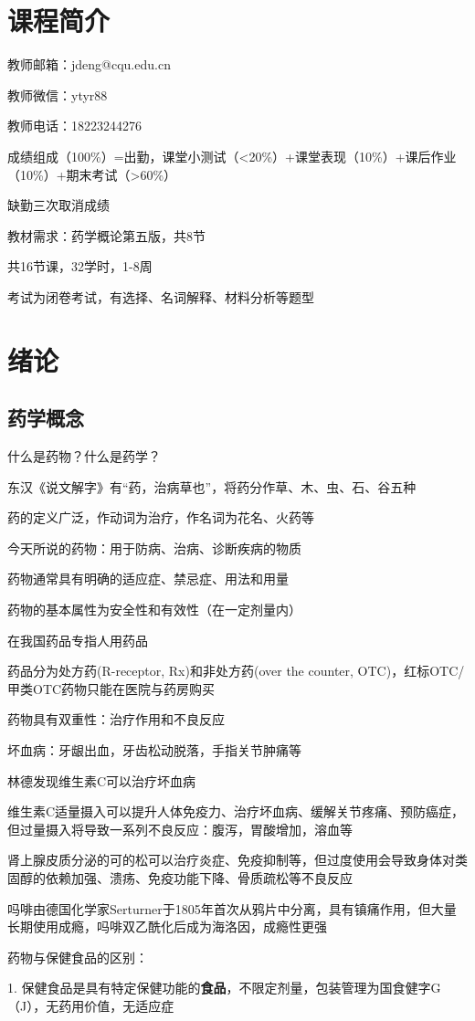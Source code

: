 \section*{课程简介}%
\label{sec:课程简介}
教师邮箱：jdeng@cqu.edu.cn

教师微信：ytyr88

教师电话：18223244276

成绩组成（100\%）=出勤，课堂小测试（<20\%）+课堂表现（10\%）+课后作业（10\%）+期末考试（>60\%）

缺勤三次取消成绩

教材需求：药学概论第五版，共8节

共16节课，32学时，1-8周

考试为闭卷考试，有选择、名词解释、材料分析等题型
\section{绪论}%
\label{sec:绪论}
\subsection{药学概念}%
\label{sub:药学概念}
\begin{question}
    什么是药物？什么是药学？
\end{question}
东汉《说文解字》有“药，治病草也”，将药分作草、木、虫、石、谷五种

药的定义广泛，作动词为治疗，作名词为花名、火药等

\begin{notation}
    今天所说的药物：用于防病、治病、诊断疾病的物质
\end{notation}
药物通常具有明确的适应症、禁忌症、用法和用量

药物的基本属性为安全性和有效性（在一定剂量内）

在我国药品专指人用药品

\begin{notation}
    药品分为处方药(R-receptor, Rx)和非处方药(over the counter, OTC)，红标OTC/甲类OTC药物只能在医院与药房购买
\end{notation}
\begin{notation}
    药物具有双重性：治疗作用和不良反应
\end{notation}
坏血病：牙龈出血，牙齿松动脱落，手指关节肿痛等

林德发现维生素C可以治疗坏血病
\begin{eg}
    维生素C适量摄入可以提升人体免疫力、治疗坏血病、缓解关节疼痛、预防癌症，但过量摄入将导致一系列不良反应：腹泻，胃酸增加，溶血等
\end{eg}
\begin{eg}
    肾上腺皮质分泌的可的松可以治疗炎症、免疫抑制等，但过度使用会导致身体对类固醇的依赖加强、溃疡、免疫功能下降、骨质疏松等不良反应
\end{eg}
\begin{eg}
    吗啡由德国化学家Serturner于1805年首次从鸦片中分离，具有镇痛作用，但大量长期使用成瘾，吗啡双乙酰化后成为海洛因，成瘾性更强
\end{eg}
\begin{question}
    药物与保健食品的区别：
\end{question}
1. 保健食品是具有特定保健功能的\textbf{食品}，不限定剂量，包装管理为国食健字G（J），无药用价值，无适应症

